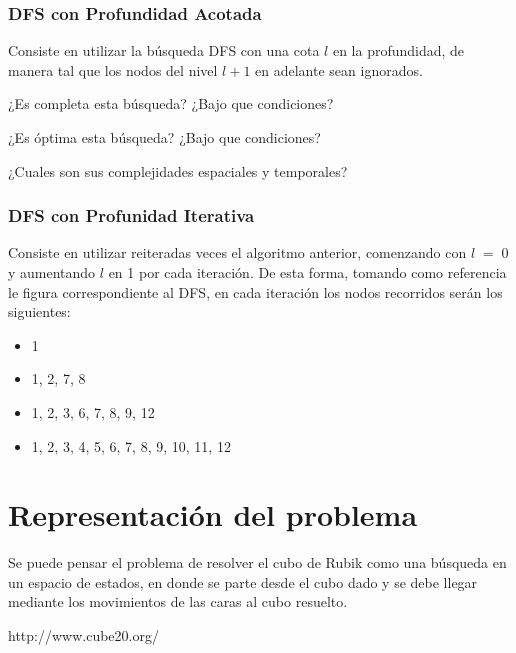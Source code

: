 \documentclass[11pt,a4paper]{article}
\begin{document}
\subsubsection{DFS con Profundidad Acotada}
Consiste en utilizar la búsqueda DFS con una cota $l$ en la profundidad, de manera tal que los nodos del nivel $l+1$ en adelante sean ignorados. 

¿Es completa esta búsqueda? ¿Bajo que condiciones?

¿Es óptima esta búsqueda? ¿Bajo que condiciones?

¿Cuales son sus complejidades espaciales y temporales?

\subsubsection{DFS con Profunidad Iterativa}
Consiste en utilizar reiteradas veces el algoritmo anterior, comenzando con $l \; = \; 0$ y aumentando $l$ en 1 por cada iteración.
De esta forma, tomando como referencia le figura correspondiente al DFS, en cada iteración los nodos recorridos serán los siguientes: 
\begin{itemize}
\item 1
\item 1, 2, 7, 8
\item 1, 2, 3, 6, 7, 8, 9, 12 
\item 1, 2, 3, 4, 5, 6, 7, 8, 9, 10, 11, 12
\end{itemize}  




\section{Representación del problema}

Se puede pensar el problema de resolver el cubo de Rubik como una búsqueda en un espacio de estados, en donde se parte desde el cubo dado y se debe llegar mediante los movimientos de las caras al cubo resuelto. 





\begin{thebibliography}{9}

  http://www.cube20.org/
  
\end{thebibliography}
\end{document}
